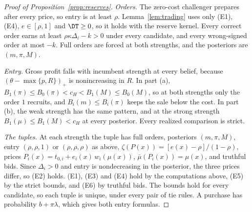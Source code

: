 \begin{proof}[Proof of Proposition~\ref{prop:reserves}]
\emph{Orders.} The zero-cost challenger prepares after every price, so entry is at least \(\rho\). Lemma~\ref{lem:trading}
uses only (E1), (E4), \(e\in[\rho,1]\) and \(\DT\ge0\), so it holds with the reserve kernel. Every correct order earns
at least \(\rho\kappa\Delta_i-k>0\) under every candidate, and every wrong-signed order at most \(-k\). Full orders are
forced at both strengths, and the posteriors are \((m,\pi,M)\).

\emph{Entry.} Gross profit falls with incumbent strength at every belief, because \((\theta-\max\{p,R\})_+\) is
nonincreasing in \(R\). In part (a), \(B_1(\pi)\le B_0(\pi)<c_H<B_1(M)\le B_0(M)\), so at both strengths only the
order \(1\) recruits, and \(B_i(m)\le B_i(\pi)\) keeps the sale below the cost. In part (b), the weak strength has
the same pattern, and at the strong strength \(B_1(\mu)\le B_1(M)<c_H\) at every posterior. Every realized comparison
is strict.

\emph{The tuples.} At each strength the tuple has full orders, posteriors \((m,\pi,M)\), entry \((\rho,\rho,1)\) or
\((\rho,\rho,\rho)\) as above, \(\zeta(P(x))=[e(x)-\rho]/(1-\rho)\), prices
\(P_i(x)=t_{0,i}+e_i(x)\,w_i(\mu(x))\), \(\bar\mu(P_i(x))=\mu(x)\), and truthful bids. Since \(\Delta_i>0\) and entry is
nondecreasing in the posterior, the three prices differ, so (E2) holds. (E1), (E3) and (E4) hold by the computations
above, (E5) by the strict bounds, and (E6) by truthful bids. The bounds hold for every candidate, so each tuple is
unique, under every pair of tie rules. A purchase has probability \(b+\pi\lambda\), which gives both entry formulas.
\end{proof}

